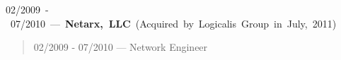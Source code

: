 \mbox{02/2009 - 07/2010 --- {\bf Netarx, LLC} (Acquired by Logicalis Group in July, 2011)}
\begin{quote}
02/2009 - 07/2010 --- Network Engineer
\end{quote}

